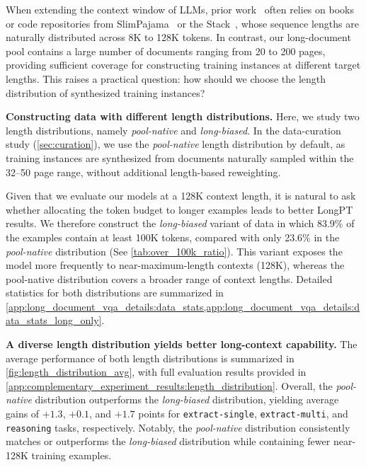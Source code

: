 \documentclass{llmxive}
\providecommand{\emph}[1]{\textit{#1}}
\providecommand{\extractsingle}{\texttt{extract-single}\xspace}
\providecommand{\extractmulti}{\texttt{extract-multi}\xspace}
\providecommand{\reasoningtask}{\texttt{reasoning}\xspace}
\begin{document}
{\begin{figure}[t]
\end{figure}
When extending the context window of LLMs, prior work~\citep{fu2024data,gao2025prolong} often relies on books or code repositories from SlimPajama~\citep{soboleva2023slimpajama} or the Stack~\citep{kocetkov2022stack}, whose sequence lengths are naturally distributed across 8K to 128K tokens.
In contrast, our long-document pool contains a large number of documents ranging from 20 to 200 pages, providing sufficient coverage for constructing training instances at different target lengths.
This raises a practical question: how should we choose the length distribution of synthesized training instances?

\noindent\textbf{Constructing data with different length distributions.}
Here, we study two length distributions, namely \emph{pool-native} and \emph{long-biased}.
In the data-curation study (\cref{sec:curation}), we use the \emph{pool-native} length distribution by default, as training instances are synthesized from documents naturally sampled within the 32--50 page range, without additional length-based reweighting.

Given that we evaluate our models at a 128K context length, it is natural to ask whether allocating the token budget to longer examples leads to better LongPT results.
We therefore construct the \emph{long-biased} variant of data in which 83.9\% of the examples contain at least 100K tokens, compared with only 23.6\% in the \emph{pool-native} distribution (See \cref{tab:over_100k_ratio}).
This variant exposes the model more frequently to near-maximum-length contexts (128K), whereas the pool-native distribution covers a broader range of context lengths.
Detailed statistics for both distributions are summarized in \cref{app:long_document_vqa_details:data_stats,app:long_document_vqa_details:data_stats_long_only}.

\noindent\textbf{A diverse length distribution yields better long-context capability.}
The average performance of both length distributions is summarized in \cref{fig:length_distribution_avg}, with full evaluation results provided in \cref{app:complementary_experiment_results:length_distribution}.
Overall, the \emph{pool-native} distribution outperforms the \emph{long-biased} distribution, yielding average gains of $+1.3$, $+0.1$, and $+1.7$ points for \extractsingle, \extractmulti, and \reasoningtask tasks, respectively.
Notably, the \emph{pool-native} distribution consistently matches or outperforms the \emph{long-biased} distribution while containing fewer near-128K training examples.

}
\end{document}
